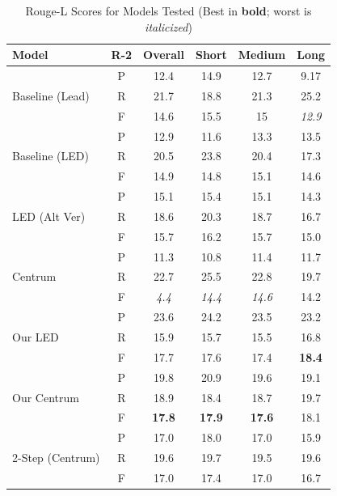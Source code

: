 \documentclass[12pt, twocolumn]{article}
\numberwithin{equation}{section}
\begin{document}
\begin{table}
    \centering
    \footnotesize
    \begin{tabular}{|p{1.5cm}|c|c|c|c|c|}
    \hline
        Model & R-2 & Overall & Short & Medium & Long \\ \hline
        \multirow{3}{1.5cm}{Baseline (Lead)}
	& P & 12.4 & 14.9 & 12.7 & 9.17 \\ \cline{2-6}
        & R & 21.7 & 18.8 & 21.3 & 25.2 \\ \cline{2-6}
        & F & 14.6 & 15.5 & 15 & \textit{12.9} \\ \hline
        \multirow{3}{1.5cm}{Baseline (LED)} 
	& P & 12.9 & 11.6 & 13.3 & 13.5 \\ \cline{2-6}
        & R & 20.5 & 23.8 & 20.4 & 17.3 \\ \cline{2-6}
        & F & 14.9 & 14.8 & 15.1 & 14.6 \\ \hline
        \multirow{3}{1.5cm}{LED (Alt Ver)} 
	& P & 15.1 & 15.4 & 15.1 & 14.3 \\ \cline{2-6}
        & R & 18.6 & 20.3 & 18.7 & 16.7 \\ \cline{2-6}
        & F & 15.7 & 16.2 & 15.7 & 15.0 \\ \hline
        \multirow{3}{1.5cm}{Centrum} 
	& P & 11.3 & 10.8 & 11.4 & 11.7 \\ \cline{2-6}
        & R & 22.7 & 25.5 & 22.8 & 19.7 \\ \cline{2-6}
        & F & \textit{4.4} & \textit{14.4} & \textit{14.6} & 14.2 \\ \hline
        \multirow{3}{1.5cm}{Our LED} 
	& P & 23.6 & 24.2 & 23.5 & 23.2 \\ \cline{2-6}
        & R & 15.9 & 15.7 & 15.5 & 16.8 \\ \cline{2-6}
        & F & 17.7 & 17.6 & 17.4 & \textbf{18.4} \\ \hline
        \multirow{3}{1.5cm}{Our Centrum} 
	& P & 19.8 & 20.9 & 19.6 & 19.1 \\ \cline{2-6}
        & R & 18.9 & 18.4 & 18.7 & 19.7 \\ \cline{2-6}
        & F & \textbf{17.8} & \textbf{17.9} & \textbf{17.6} & 18.1 \\ \hline
        \multirow{3}{1.5cm}{2-Step (Centrum)} 
	& P & 17.0 & 18.0 & 17.0 & 15.9 \\ \cline{2-6}
        & R & 19.6 & 19.7 & 19.5 & 19.6 \\ \cline{2-6}
        & F & 17.0 & 17.4 & 17.0 & 16.7 \\ \hline
    \end{tabular}
    \caption{Rouge-L Scores for Models Tested (Best in \textbf{bold}; worst is \textit{italicized})}
    \label{tab:rouge-l}
\end{table}
\end{document}
